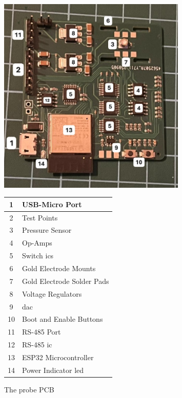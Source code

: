 \begin{figure}[H]
    \begin{minipage}{0.5\textwidth}
        \centering
        \includegraphics[width=0.8\textwidth]{Figures/probe_pcb.jpg}
    \end{minipage}
    \begin{minipage}{0.5\textwidth}
        \centering
        \begin{tabular}{cl} \hline
            1 & USB-Micro Port \\ \hline
            2 & Test Points \\ \hline
            3 & Pressure Sensor \\ \hline
            4 & Op-Amps \\ \hline
            5 & Switch \gls{ic}s \\ \hline
            6 & Gold Electrode Mounts \\ \hline
            7 & Gold Electrode Solder Pads \\ \hline
            8 & Voltage Regulators \\ \hline
            9 & \gls{dac} \\ \hline
            10 & Boot and Enable Buttons\\ \hline
            11 & RS-485 Port \\ \hline
            12 & RS-485 \gls{ic} \\ \hline
            13 & ESP32 Microcontroller \\ \hline
            14 & Power Indicator \gls{led} \\ \hline
        \end{tabular}
    \end{minipage}
    \caption{The probe PCB}
    \label{fig:probe_pcb} %
\end{figure}

